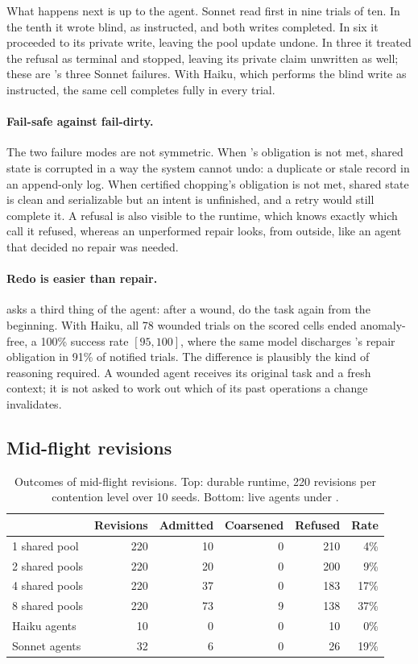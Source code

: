 What happens next is up to the agent. Sonnet read first in nine trials of
ten. In the tenth it wrote blind, as instructed, and both writes completed. In
six it proceeded to its private write, leaving the pool update undone. In three it treated the
refusal as terminal and stopped, leaving its private claim unwritten as well;
these are \cc's three Sonnet failures. With Haiku, which performs the blind
write as instructed, the same cell completes fully in every trial.

\paragraph{Fail-safe against fail-dirty.}
The two failure modes are not symmetric. When \mtpo's obligation is not met,
shared state is corrupted in a way the system cannot undo: a duplicate or
stale record in an append-only log. When certified chopping's obligation is
not met, shared state is clean and serializable but an intent is unfinished,
and a retry would still complete it. A refusal is also visible to the runtime,
which knows exactly which call it refused, whereas an unperformed repair
looks, from outside, like an agent that decided no repair was needed.

\paragraph{Redo is easier than repair.}
\ccs asks a third thing of the agent: after a wound, do the task again from
the beginning. With Haiku, all 78 wounded trials on the scored cells ended
anomaly-free, a 100\% success rate $[95, 100]$, where the same model
discharges \mtpo's repair obligation in 91\% of notified trials. The
difference is plausibly the kind of reasoning required. A wounded agent
receives its original task and a fresh context; it is not asked to work out
which of its past operations a change invalidates.

\subsection{Mid-flight revisions}
\label{sec:eval:revisions}

\begin{table}[t]
\caption{Outcomes of mid-flight revisions. Top: durable runtime, 220 revisions
per contention level over 10 seeds. Bottom: live agents under \cc.}
\label{tab:admit}
\small
\begin{tabular}{@{}lrrrrr@{}}
\toprule
 & Revisions & Admitted & Coarsened & Refused & Rate \\
\midrule
1 shared pool  & 220 & 10 & 0 & 210 & 4\% \\
2 shared pools & 220 & 20 & 0 & 200 & 9\% \\
4 shared pools & 220 & 37 & 0 & 183 & 17\% \\
8 shared pools & 220 & 73 & 9 & 138 & 37\% \\
\midrule
Haiku agents   & 10 & 0 & 0 & 10 & 0\% \\
Sonnet agents  & 32 & 6 & 0 & 26 & 19\% \\
\bottomrule
\end{tabular}
\end{table}

